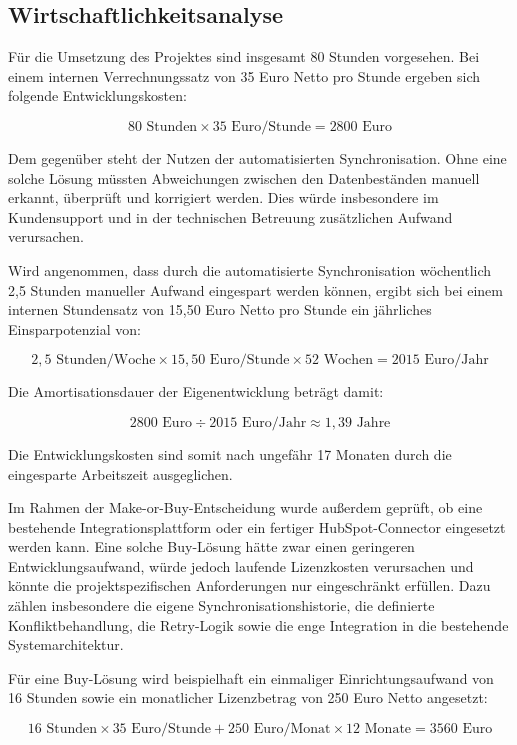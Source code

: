 \subsection{Wirtschaftlichkeitsanalyse}
\label{sec:Wirtschaftlichkeitsanalyse}
Für die Umsetzung des Projektes sind insgesamt 80 Stunden vorgesehen.
Bei einem internen Verrechnungssatz von 35 Euro Netto pro Stunde ergeben sich folgende Entwicklungskosten:

\[
80 \text{ Stunden} \times 35 \text{ Euro/Stunde} = 2800 \text{ Euro}
\]

Dem gegenüber steht der Nutzen der automatisierten Synchronisation.
Ohne eine solche Lösung müssten Abweichungen zwischen den Datenbeständen manuell erkannt, überprüft und korrigiert werden.
Dies würde insbesondere im Kundensupport und in der technischen Betreuung zusätzlichen Aufwand verursachen.
\par\smallskip
Wird angenommen, dass durch die automatisierte Synchronisation wöchentlich 2,5 Stunden manueller Aufwand eingespart werden können,
ergibt sich bei einem internen Stundensatz von 15,50 Euro Netto pro Stunde ein jährliches Einsparpotenzial von:

\[
2{,}5 \text{ Stunden/Woche} \times 15{,}50 \text{ Euro/Stunde} \times 52 \text{ Wochen} = 2015 \text{ Euro/Jahr}
\]

Die Amortisationsdauer der Eigenentwicklung beträgt damit:

\[
2800 \text{ Euro} \div 2015 \text{ Euro/Jahr} \approx 1{,}39 \text{ Jahre}
\]

Die Entwicklungskosten sind somit nach ungefähr 17 Monaten durch die eingesparte Arbeitszeit ausgeglichen.
\par\smallskip
Im Rahmen der Make-or-Buy-Entscheidung wurde außerdem geprüft, ob eine bestehende Integrationsplattform oder ein fertiger HubSpot-Connector eingesetzt werden kann.
Eine solche Buy-Lösung hätte zwar einen geringeren Entwicklungsaufwand, würde jedoch laufende Lizenzkosten verursachen und könnte die projektspezifischen Anforderungen nur eingeschränkt erfüllen.
Dazu zählen insbesondere die eigene Synchronisationshistorie, die definierte Konfliktbehandlung, die Retry-Logik sowie die enge Integration in die bestehende Systemarchitektur.
\par\smallskip
Für eine Buy-Lösung wird beispielhaft ein einmaliger Einrichtungsaufwand von 16 Stunden sowie ein monatlicher Lizenzbetrag von 250 Euro Netto angesetzt:

\[
16 \text{ Stunden} \times 35 \text{ Euro/Stunde} + 250 \text{ Euro/Monat} \times 12 \text{ Monate} = 3560 \text{ Euro}
\]

